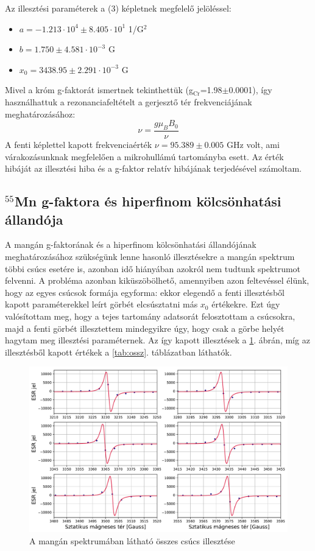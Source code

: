 \documentclass[12pt,a4paper]{article}
\begin{document}
\newline
Az illesztési paraméterek a (3) képletnek megfelelő jelöléssel:
\begin{itemize}
\item{$a=-1.213 \cdot 10^{4} \pm 8.405 \cdot 10^{1}$ 1/G$^2$}
\item{$b=1.750 \pm 4.581 \cdot 10^{-3}$ G}
\item{$x_0=3438.95 \pm 2.291 \cdot 10^{-3}$ G}
\end{itemize}
Mivel a króm g-faktorát ismertnek tekinthettük (g$_{\textrm{Cr}}$=1.98$\pm$0.0001), így használhattuk a rezonanciafeltételt a gerjesztő tér frekvenciájának meghatározásához:
\begin{equation}
\nu = \frac{g\mu_B B_0}{\nu}
\end{equation}
A fenti képlettel kapott frekvenciaérték $\nu=95.389 \pm 0.005$ GHz volt, ami várakozásunknak megfelelően a mikrohullámú tartományba esett. Az érték hibáját az illesztési hiba és a g-faktor relatív hibájának terjedésével számoltam. \\
\newpage
\subsection{$^{55}$Mn g-faktora és hiperfinom kölcsönhatási állandója}
A mangán g-faktorának és a hiperfinom kölcsönhatási állandójának meghatározásához szükségünk lenne hasonló illesztésekre a mangán spektrum többi csúcs esetére is, azonban idő hiányában azokról nem tudtunk spektrumot felvenni. A probléma azonban kiküszöbölhető, amennyiben azon feltevéssel élünk, hogy az egyes csúcsok formája egyforma: ekkor elegendő a fenti illesztésből kapott paraméterekkel leírt görbét elcsúsztatni más $x_0$ értékekre. Ezt úgy valósítottam meg, hogy a tejes tartomány adatsorát felosztottam a csúcsokra, majd a fenti görbét illesztettem mindegyikre úgy, hogy csak a görbe helyét hagytam meg illesztési paraméternek. Az így kapott illesztések a \ref{fig:mn_ossz}. ábrán, míg az illesztésből kapott értékek a  \ref{tab:ossz}. táblázatban láthatók.\\

\begin{figure}[!h]
\centering
\includegraphics[scale=0.55]{mang_teljes_fits}
\caption{A mangán spektrumában látható összes csúcs illesztése}
\label{fig:mn_ossz}
\end{figure}
\end{document}
